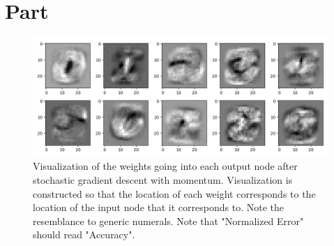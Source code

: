 \documentclass{article}
\newcommand{\enterproblemHeader}[1]{
}
\newcommand{\exitproblemHeader}[1]{
}
\newcounter{problem} %
\newcommand{\problemName}{}
\newenvironment{problem}[1][Part \theproblem]{ %
	\stepcounter{problem} %
	\renewcommand{\problemName}{#1} %
	\section{\problemName} %
	\enterproblemHeader{\problemName} %
}{
	\exitproblemHeader{\problemName} %
}
\begin{document}
\begin{problem}
	\begin{figure}
		\includegraphics[width=\linewidth]{digit_visualization_momentum}
		\caption{Visualization of the weights going into each output node after stochastic gradient descent with momentum. Visualization is constructed so that the location of each weight corresponds to the location of the input node that it corresponds to. Note the resemblance to generic numerals. Note that "Normalized Error" should read "Accuracy".}
		\label{fig:digit vis momentum}
	\end{figure}
\end{problem}
\clearpage

\end{document}

